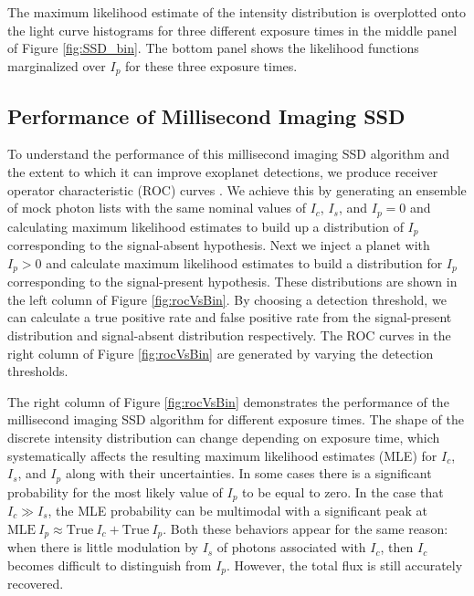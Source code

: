 \documentclass[../main.tex]{subfiles}
\begin{document}
The maximum likelihood estimate of the intensity distribution is overplotted onto the light curve histograms for three different exposure times in the middle panel of Figure \ref{fig:SSD_bin}. The bottom panel shows the likelihood functions marginalized over $I_p$ for these three exposure times. 

\subsection{Performance of Millisecond Imaging SSD}

To understand the performance of this millisecond imaging SSD algorithm and the extent to which it can improve exoplanet detections, we produce receiver operator characteristic (ROC) curves \parencite{Tanner1954,DeLong+DeLong+Clarke-Pearson_1988,Krzanowski2009,Jensen_Clem_2017}. We achieve this by generating an ensemble of mock photon lists with the same nominal values of $I_c$, $I_s$, and $I_p=0$ and calculating maximum likelihood estimates to build up a distribution of $I_p$ corresponding to the signal-absent hypothesis. Next we inject a planet with $I_p>0$ and calculate maximum likelihood estimates to build a distribution for $I_p$ corresponding to the signal-present hypothesis. These distributions are shown in the left column of Figure \ref{fig:rocVsBin}. By choosing a detection threshold, we can calculate a true positive rate and false positive rate from the signal-present distribution and signal-absent distribution respectively. The ROC curves in the right column of Figure \ref{fig:rocVsBin} are generated by varying the detection thresholds.

The right column of Figure \ref{fig:rocVsBin} demonstrates the performance of the millisecond imaging SSD algorithm for different exposure times. The shape of the discrete intensity distribution can change depending on exposure time, which systematically affects the resulting maximum likelihood estimates (MLE) for $I_c$, $I_s$, and $I_p$ along with their uncertainties. In some cases there is a significant probability for the most likely value of $I_p$ to be equal to zero. In the case that $I_c \gg I_s$, the MLE probability can be multimodal with a significant peak at $\textrm{MLE}~I_p \approx \textrm{True}~I_c + \textrm{True}~I_p$. Both these behaviors appear for the same reason: when there is little modulation by $I_s$ of photons associated with $I_c$, then $I_c$ becomes difficult to distinguish from $I_p$. However, the total flux is still accurately recovered. 
\end{document}
